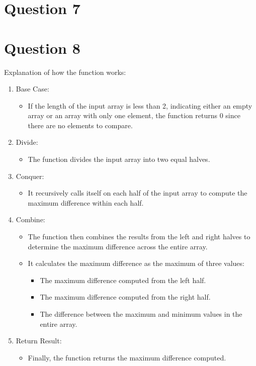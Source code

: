 \documentclass{article}
\begin{document}
\section*{Question 7}
\newpage
\section*{Question 8}
Explanation of how the function works:

\begin{enumerate}
    \item Base Case:
          \begin{itemize}
              \item If the length of the input array is less than 2, indicating either an empty array or an array with only one element, the function returns 0 since there are no elements to compare.
          \end{itemize}

    \item Divide:
          \begin{itemize}
              \item The function divides the input array into two equal halves.
          \end{itemize}

    \item Conquer:
          \begin{itemize}
              \item It recursively calls itself on each half of the input array to compute the maximum difference within each half.
          \end{itemize}

    \item Combine:
          \begin{itemize}
              \item The function then combines the results from the left and right halves to determine the maximum difference across the entire array.
              \item It calculates the maximum difference as the maximum of three values:
                    \begin{itemize}
                        \item The maximum difference computed from the left half.
                        \item The maximum difference computed from the right half.
                        \item The difference between the maximum and minimum values in the entire array.
                    \end{itemize}
          \end{itemize}

    \item Return Result:
          \begin{itemize}
              \item Finally, the function returns the maximum difference computed.
          \end{itemize}
\end{enumerate}
\end{document}
